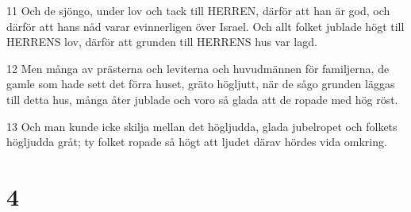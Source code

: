 \par 11 Och de sjöngo, under lov och tack till HERREN, därför att han är god, och därför att hans nåd varar evinnerligen över Israel. Och allt folket jublade högt till HERRENS lov, därför att grunden till HERRENS hus var lagd.
\par 12 Men många av prästerna och leviterna och huvudmännen för familjerna, de gamle som hade sett det förra huset, gräto högljutt, när de sågo grunden läggas till detta hus, många åter jublade och voro så glada att de ropade med hög röst.
\par 13 Och man kunde icke skilja mellan det högljudda, glada jubelropet och folkets högljudda gråt; ty folket ropade så högt att ljudet därav hördes vida omkring.

\chapter{4}

